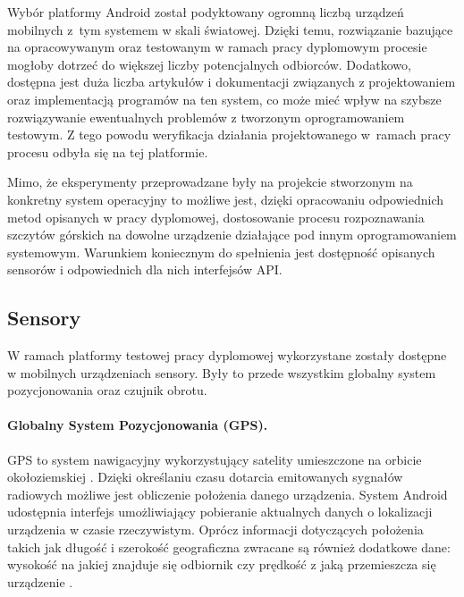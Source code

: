 \par

Wybór platformy Android został podyktowany ogromną liczbą urządzeń mobilnych z~tym systemem w skali światowej. Dzięki temu, rozwiązanie bazujące na opracowywanym oraz testowanym w ramach pracy dyplomowym procesie mogłoby dotrzeć do większej liczby potencjalnych odbiorców. Dodatkowo, dostępna jest duża liczba artykułów i dokumentacji związanych z projektowaniem oraz implementacją programów na ten system, co może mieć wpływ na szybsze rozwiązywanie ewentualnych problemów z tworzonym oprogramowaniem testowym. Z tego powodu weryfikacja działania projektowanego w~ramach pracy procesu odbyła się na tej platformie.

\par

Mimo, że eksperymenty przeprowadzane były na projekcie stworzonym na konkretny system operacyjny to możliwe jest, dzięki opracowaniu odpowiednich metod opisanych w pracy dyplomowej, dostosowanie procesu rozpoznawania szczytów górskich na dowolne urządzenie działające pod innym oprogramowaniem systemowym. Warunkiem koniecznym do spełnienia jest dostępność opisanych sensorów i odpowiednich dla nich interfejsów API. 

\subsection{Sensory}

W ramach platformy testowej pracy dyplomowej wykorzystane zostały dostępne w mobilnych urządzeniach sensory. Były to przede wszystkim globalny system pozycjonowania oraz czujnik obrotu.

\paragraph{Globalny System Pozycjonowania (GPS).} GPS to system nawigacyjny wykorzystujący satelity umieszczone na orbicie okołoziemskiej \cite{GPS}. Dzięki określaniu czasu dotarcia emitowanych sygnałów radiowych możliwe jest obliczenie położenia danego urządzenia. System Android udostępnia interfejs umożliwiający pobieranie aktualnych danych o lokalizacji urządzenia w czasie rzeczywistym. Oprócz informacji dotyczących położenia takich jak długość i szerokość geograficzna zwracane są również dodatkowe dane:  wysokość na jakiej znajduje się odbiornik czy prędkość z jaką przemieszcza się urządzenie \cite{android_location}.

\par


